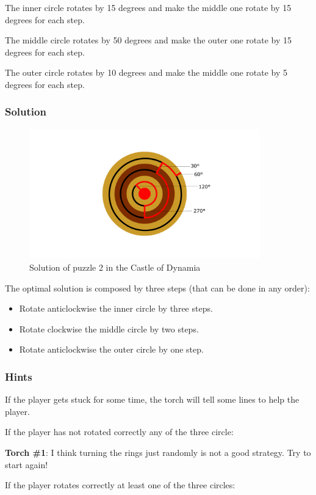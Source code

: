 The inner circle rotates by 15 degrees and make the middle one rotate by 15 degrees for each step.

The middle circle rotates by 50 degrees and make the outer one rotate by 15 degrees for each step.

The outer circle rotates by 10 degrees and make the middle one rotate by 5 degrees for each step.

\subsubsection*{Solution}
\begin{figure}[H]
  \centering
  \includegraphics[width=10cm]{Images/Puzzles/castleOfDynamia2Solution}
  \caption{Solution of puzzle 2 in the Castle of Dynamia}
\end{figure}

The optimal solution is composed by three steps (that can be done in any order):
\begin{itemize}
	\item Rotate anticlockwise the inner circle by three steps.
	\item Rotate clockwise the middle circle by two steps.
	\item Rotate anticlockwise the outer circle by one step.
\end{itemize}

\subsubsection*{Hints}
If the player gets stuck for some time, the torch will tell some lines to help the player.

If the player has not rotated correctly any of the three circle:

\textbf{Torch \#{}1}: I think turning the rings just randomly is not a good strategy. Try to start again!

If the player rotates correctly at least one of the three circles:


